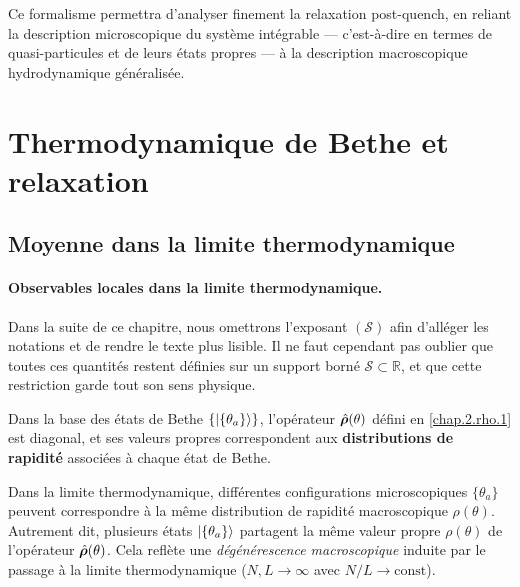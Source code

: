\smallskip

Ce formalisme permettra d’analyser finement la relaxation post-quench, en reliant la description microscopique du système intégrable — c’est-à-dire en termes de quasi-particules et de leurs états propres — à la description macroscopique hydrodynamique généralisée.




%

\section{Thermodynamique de Bethe et relaxation}

\subsection{Moyenne dans la limite thermodynamique}

\paragraph{Observables locales dans la limite thermodynamique.}
Dans la suite de ce chapitre, nous omettrons l’exposant $(\mathcal{S})$ afin d’alléger les notations et de rendre le texte plus lisible. 
Il ne faut cependant pas oublier que toutes ces quantités restent définies sur un support borné \(\mathcal{S} \subset \mathbb{R}\), et que cette restriction garde tout son sens physique.

\vspace{0.2em}

\medskip

Dans la base des états de Bethe \( \{ \ket{\{ \theta_a \}} \} \), l’opérateur \( \hat{\bm{\rho}}(\theta) \) défini en \eqref{chap.2.rho.1} est diagonal, et ses valeurs propres correspondent aux {\bf distributions de rapidité} associées à chaque état de Bethe.

\vspace{0.5em}
\medskip

Dans la limite thermodynamique, différentes configurations microscopiques \( \{ \theta_a \} \) peuvent correspondre à la même distribution de rapidité macroscopique \( \rho(\theta) \). Autrement dit, plusieurs états \( \ket{\{ \theta_a \}} \) partagent la même valeur propre \( \rho(\theta) \) de l’opérateur \( \hat{\bm{\rho}}(\theta) \). Cela reflète une {\em dégénérescence macroscopique} induite par le passage à la limite thermodynamique (\( N, L \to \infty \) avec \( N/L \to \text{const} \)).

